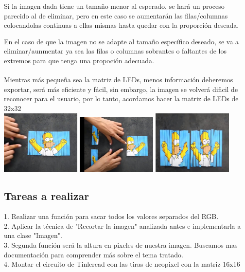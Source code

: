 \documentclass{article}
\begin{document}
Si la imagen dada tiene un tamaño menor al esperado, se hará un proceso parecido al de eliminar, pero en este caso se aumentarán las filas/columnas colocandolas continuas a ellas mismas  hasta quedar con la proporción deseada.

En el caso de que la imagen no se adapte al tamaño específico deseado, se va a eliminar/aunmentar ya sea las filas o columnas sobrantes o faltantes de los extremos para que tenga una propoción adecuada.\\
\\Mientras más pequeña sea la matriz de LEDs, menos información deberemos exportar, será más eficiente y fácil, sin embargo, la imagen se volverá dificil de reconocer para el usuario, por lo tanto, acordamos hacer la matriz de LEDs de 32x32\\


\includegraphics[width=4cm]{Imagenes/recorte1.jpeg}
\includegraphics[width=4cm]{Imagenes/recorte2.jpeg}
\includegraphics[width=4cm]{Imagenes/recorte3.jpeg}
\vspace{0,3cm}

\subsection{Tareas a realizar}
1. Realizar una función para sacar todos los valores separados del RGB.\\
2. Aplicar la técnica de "Recortar la imagen" analizada antes e implementarla a una clase "Imagen".\\
3. Segunda función será la altura en pixeles de nuestra imagen. Buscamos mas documentación para comprender más sobre el tema tratado.\\
4. Montar el circuito de Tinlercad con las tiras de neopixel con la matriz 16x16
\end{document}
